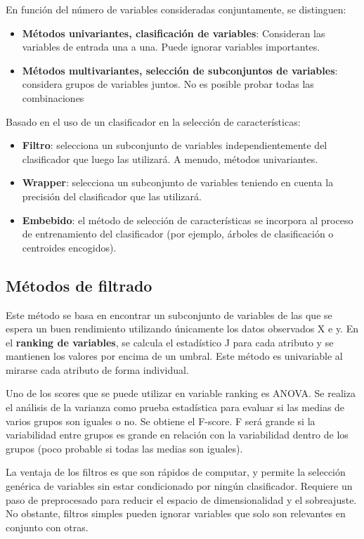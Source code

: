En función del número de variables consideradas conjuntamente, se distinguen:
\begin{itemize}
\item \textbf{Métodos univariantes, clasificación de variables}: Consideran las variables de entrada una a una. Puede ignorar variables importantes.
\item \textbf{Métodos multivariantes, selección de subconjuntos de variables}: considera grupos de variables juntos. No es posible probar todas las combinaciones
\end{itemize}

Basado en el uso de un clasificador en la selección de características:
\begin{itemize}
\item \textbf{Filtro}: selecciona un subconjunto de variables independientemente del clasificador que luego las utilizará. A menudo, métodos univariantes.
\item \textbf{Wrapper}: selecciona un subconjunto de variables teniendo en cuenta la precisión del clasificador que las utilizará.
\item \textbf{Embebido}: el método de selección de características se incorpora al proceso de entrenamiento del clasificador (por ejemplo, árboles de clasificación o centroides encogidos).
\end{itemize}

\subsection{Métodos de filtrado}
Este método se basa en encontrar un subconjunto de variables de las que se espera un buen rendimiento utilizando únicamente los datos observados X e y. En el \textbf{ranking de variables}, se calcula el estadístico J para cada atributo y se mantienen los valores por encima de un umbral. Este método es univariable al mirarse cada atributo de forma individual.

Uno de los scores que se puede utilizar en variable ranking es ANOVA. Se realiza el análisis de la varianza como prueba estadística para evaluar si las medias de varios grupos son iguales o no. Se obtiene el F-score. F será grande si la variabilidad entre grupos es grande en relación con la variabilidad dentro de los grupos (poco probable si todas las medias son iguales).

La ventaja de los filtros es que son rápidos de computar, y permite la selección genérica de variables sin estar condicionado por ningún clasificador. Requiere un paso de preprocesado para reducir el espacio de dimensionalidad y el sobreajuste. No obstante, filtros simples pueden ignorar variables que solo son relevantes en conjunto con otras.

